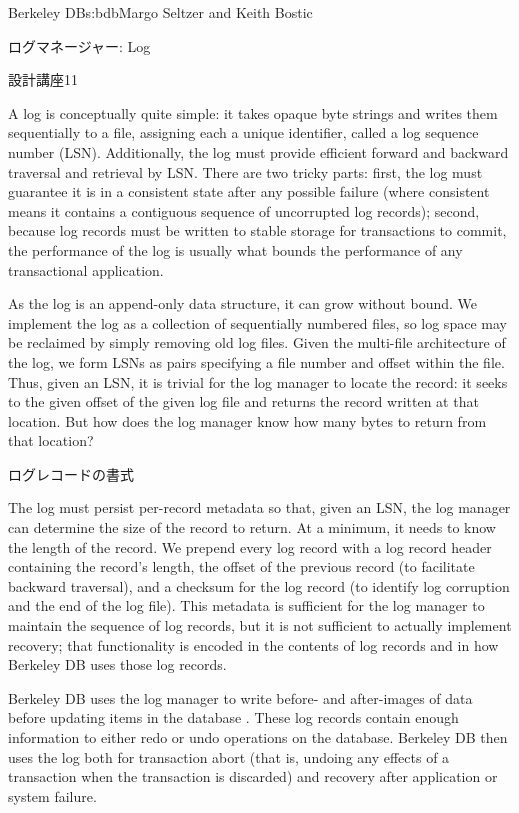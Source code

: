 \begin{aosachapter}{Berkeley DB}{s:bdb}{Margo Seltzer and Keith Bostic}
\begin{aosasect1}{ログマネージャー: Log}
\begin{aosabox}{設計講座11}
\end{aosabox}

A log is conceptually quite simple: it takes opaque byte strings and
writes them sequentially to a file, assigning each a unique
identifier, called a log sequence number (LSN). Additionally, the log
must provide efficient forward and backward traversal and retrieval by
LSN\@.  There are two tricky parts: first, the log must guarantee it is
in a consistent state after any possible failure (where consistent
means it contains a contiguous sequence of uncorrupted log records);
second, because log records must be written to stable storage for
transactions to commit, the performance of the log is usually what
bounds the performance of any transactional application.

As the log is an append-only data structure, it can grow without
bound.  We implement the log as a collection of sequentially numbered
files, so log space may be reclaimed by simply removing old log
files. Given the multi-file architecture of the log, we form LSNs as
pairs specifying a file number and offset within the file. Thus, given
an LSN, it is trivial for the log manager to locate the record: it
seeks to the given offset of the given log file and returns the record
written at that location. But how does the log manager know how many
bytes to return from that location?

\begin{aosasect2}{ログレコードの書式}

The log must persist per-record metadata so that, given an LSN, the
log manager can determine the size of the record to return. At a
minimum, it needs to know the length of the record. We prepend every
log record with a log record header containing the record's length,
the offset of the previous record (to facilitate backward traversal),
and a checksum for the log record (to identify log corruption and the
end of the log file). This metadata is sufficient for the log manager
to maintain the sequence of log records, but it is not sufficient to
actually implement recovery; that functionality is encoded in the
contents of log records and in how Berkeley DB uses those log records.


Berkeley DB uses the log manager to write before- and after-images of
data before updating items in the database
\cite{bib:haerder:recovery}.  These log records contain enough
information to either redo or undo operations on the
database. Berkeley DB then uses the log both for transaction abort
(that is, undoing any effects of a transaction when the transaction is
discarded) and recovery after application or system failure.


\end{aosasect2}
\end{aosasect1}
\end{aosachapter}
